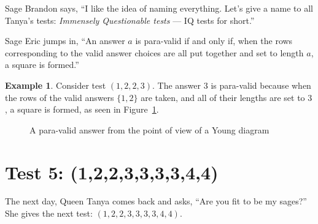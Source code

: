\documentclass[12pt,reqno]{article}
\theoremstyle{plain}
\theoremstyle{definition}
\newtheorem{example}{Example}
\theoremstyle{remark}
\begin{document}
Sage Brandon says, ``I like the idea of naming everything. Let's give a name to all Tanya's tests: \textit{Immensely Questionable tests} --- IQ tests for short.''

Sage Eric jumps in, ``An answer $a$ is para-valid if and only if, when the rows corresponding to the valid answer choices are all put together and set to length $a$, a square is formed.''

\begin{example}
    Consider test $(1, 2, 2, 3)$. The answer $3$ is para-valid because when the rows of the valid answers $\{1, 2\}$ are taken, and all of their lengths are set to $3$, a square is formed, as seen in Figure~\ref{fig:paravalid}.

\begin{figure}[ht!]
    \centering
{}
    \caption{A para-valid answer from the point of view of a Young diagram}
    \label{fig:paravalid}
\end{figure}
\end{example}


\section{Test 5: (1,2,2,3,3,3,3,4,4)}

The next day, Queen Tanya comes back and asks, ``Are you fit to be my sages?'' She gives the next test: $(1,2,2,3,3,3,3,4,4)$.
\end{document}
